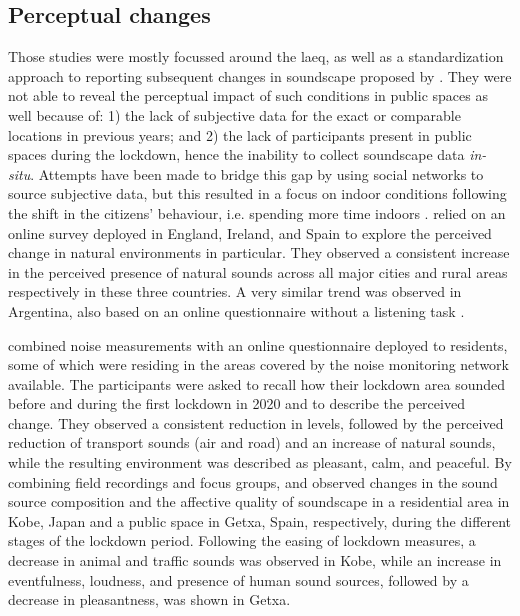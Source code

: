 
\subsection{Perceptual changes}

 Those studies were mostly focussed around the \gls{laeq}, as well as a standardization approach to reporting subsequent changes in soundscape proposed by \citet{Asensio2020Taxonomy}. They were not able to reveal the perceptual impact of such conditions in public spaces as well because of: 1) the lack of subjective data for the exact or comparable locations in previous years; and 2) the lack of participants present in public spaces during the lockdown, hence the inability to collect soundscape data \emph{in-situ}. Attempts have been made to bridge this gap by using social networks to source subjective data, but this resulted in a focus on indoor conditions following the shift in the citizens' behaviour, i.e. spending more time indoors \citep{Bartalucci2021survey,Lee2021Attitudes}. \citet{GarridoCumbrera2021Perceptions} relied on an online survey deployed in England, Ireland, and Spain to explore the perceived change in natural environments in particular. They observed a consistent increase in the perceived presence of natural sounds across all major cities and rural areas respectively in these three countries. A very similar trend was observed in Argentina, also based on an online questionnaire without a listening task \citep{Maggi2021Perception}. 
 
 \citet{Munoz2020Lockdown} combined noise measurements with an online questionnaire deployed to residents, some of which were residing in the areas covered by the noise monitoring network available. The participants were asked to recall how their lockdown area sounded before and during the first lockdown in 2020 and to describe the perceived change. They observed a consistent reduction in levels, followed by the perceived reduction of transport sounds (air and road) and an increase of natural sounds, while the resulting environment was described as pleasant, calm, and peaceful. By combining field recordings and focus groups, \citet{Sakagami2020How} and \citet{Lenzi2021Soundscape} observed changes in the sound source composition and the affective quality of soundscape in a residential area in Kobe, Japan and a public space in Getxa, Spain, respectively, during the different stages of the lockdown period. Following the easing of lockdown measures, a decrease in animal and traffic sounds was observed in Kobe, while an increase in eventfulness, loudness, and presence of human sound sources, followed by a decrease in pleasantness, was shown in Getxa.

